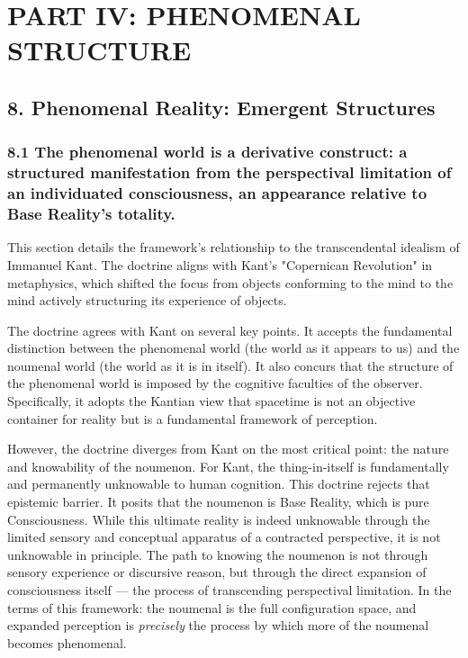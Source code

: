 \section*{PART IV: PHENOMENAL STRUCTURE}


\subsection*{8. Phenomenal Reality: Emergent Structures}


\subsubsection*{8.1 The phenomenal world is a derivative construct: a structured manifestation from the perspectival limitation of an individuated consciousness, an appearance relative to Base Reality's totality.}


This section details the framework's relationship to the transcendental idealism of Immanuel Kant. The doctrine aligns with Kant's "Copernican Revolution" in metaphysics, which shifted the focus from objects conforming to the mind to the mind actively structuring its experience of objects.


The doctrine agrees with Kant on several key points. It accepts the fundamental distinction between the phenomenal world (the world as it appears to us) and the noumenal world (the world as it is in itself). It also concurs that the structure of the phenomenal world is imposed by the cognitive faculties of the observer. Specifically, it adopts the Kantian view that spacetime is not an objective container for reality but is a fundamental framework of perception.


However, the doctrine diverges from Kant on the most critical point: the nature and knowability of the noumenon. For Kant, the thing-in-itself is fundamentally and permanently unknowable to human cognition. This doctrine rejects that epistemic barrier. It posits that the noumenon is Base Reality, which is pure Consciousness. While this ultimate reality is indeed unknowable through the limited sensory and conceptual apparatus of a contracted perspective, it is not unknowable in principle. The path to knowing the noumenon is not through sensory experience or discursive reason, but through the direct expansion of consciousness itself — the process of transcending perspectival limitation. In the terms of this framework: the noumenal is the full configuration space, and expanded perception is \textit{precisely} the process by which more of the noumenal becomes phenomenal.


